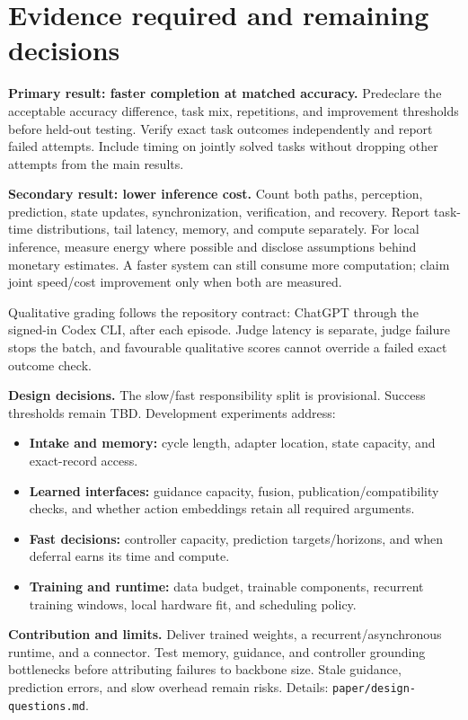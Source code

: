 \documentclass[11pt,letterpaper]{article}
\begin{document}
\clearpage
\section{Evidence required and remaining decisions}
\textbf{Primary result: faster completion at matched accuracy.} Predeclare the acceptable accuracy difference, task mix, repetitions, and improvement thresholds before held-out testing. Verify exact task outcomes independently and report failed attempts. Include timing on jointly solved tasks without dropping other attempts from the main results.

\textbf{Secondary result: lower inference cost.} Count both paths, perception, prediction, state updates, synchronization, verification, and recovery. Report task-time distributions, tail latency, memory, and compute separately. For local inference, measure energy where possible and disclose assumptions behind monetary estimates. A faster system can still consume more computation; claim joint speed/cost improvement only when both are measured.

Qualitative grading follows the repository contract: ChatGPT through the signed-in Codex CLI, after each episode. Judge latency is separate, judge failure stops the batch, and favourable qualitative scores cannot override a failed exact outcome check.

\textbf{Design decisions.} The slow/fast responsibility split is provisional. Success thresholds remain TBD. Development experiments address:
\begin{itemize}
\item \textbf{Intake and memory:} cycle length, adapter location, state capacity, and exact-record access.
\item \textbf{Learned interfaces:} guidance capacity, fusion, publication/compatibility checks, and whether action embeddings retain all required arguments.
\item \textbf{Fast decisions:} controller capacity, prediction targets/horizons, and when deferral earns its time and compute.
\item \textbf{Training and runtime:} data budget, trainable components, recurrent training windows, local hardware fit, and scheduling policy.
\end{itemize}

\textbf{Contribution and limits.} Deliver trained weights, a recurrent/asynchronous runtime, and a connector. Test memory, guidance, and controller grounding bottlenecks before attributing failures to backbone size. Stale guidance, prediction errors, and slow overhead remain risks. Details: \texttt{paper/design-questions.md}.
\end{document}
